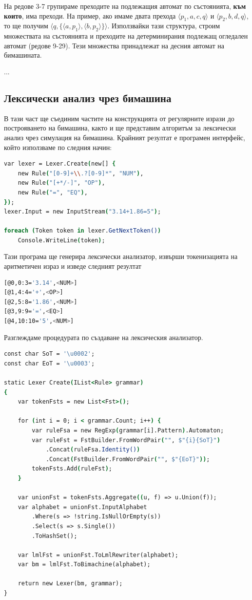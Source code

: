 \documentclass[12pt, oneside]{article}
\theoremstyle{definition}
\begin{document}
На редове 3-7 групираме преходите на подлежащия автомат по състоянията, \textbf{към които}, има преходи. На пример, ако имаме двата прехода \( \langle p_1, a, c, q \rangle \) и \( \langle p_2, b, d, q \rangle \), то ще получим \( \langle q, \{ \langle a, p_1 \rangle, \langle b, p_2 \rangle \} \rangle \). Използвайки тази структура, строим множествата на състоянията и преходите на детерминирания подлежащ огледален автомат (редове 9-29). Тези множества принадлежат на десния автомат на бимашината.

...

\subsection{Лексически анализ чрез бимашина}

В тази част ще съединим частите на конструкцията от регулярните изрази до построяването на бимашина, както и ще представим алгоритъм за лексически анализ чрез симулация на бимашина. Крайният резултат е програмен интерфейс, който използваме по следния начин:

\begin{lstlisting}[language=csh,firstnumber=1]
var lexer = Lexer.Create(new[] {
    new Rule("[0-9]+\\.?[0-9]*", "NUM"),
    new Rule("[+*/-]", "OP"),
    new Rule("=", "EQ"),
});
lexer.Input = new InputStream("3.14+1.86=5");

foreach (Token token in lexer.GetNextToken())
    Console.WriteLine(token);
\end{lstlisting}

Тази програма ще генерира лексически анализатор, извърши токенизацията на аритметичен израз и изведе следният резултат

\begin{lstlisting}[language=bash]
[@0,0:3='3.14',<NUM>]
[@1,4:4='+',<OP>]
[@2,5:8='1.86',<NUM>]
[@3,9:9='=',<EQ>]
[@4,10:10='5',<NUM>]
\end{lstlisting}

Разглеждаме процедурата по създаване на лексическия анализатор.

\begin{lstlisting}[language=csh]
const char SoT = '\u0002';
const char EoT = '\u0003';

static Lexer Create(IList<Rule> grammar)
{
    var tokenFsts = new List<Fst>();

    for (int i = 0; i < grammar.Count; i++) {
        var ruleFsa = new RegExp(grammar[i].Pattern).Automaton;
        var ruleFst = FstBuilder.FromWordPair("", $"{i}{SoT}")
            .Concat(ruleFsa.Identity())
            .Concat(FstBuilder.FromWordPair("", $"{EoT}"));
        tokenFsts.Add(ruleFst);
    }

    var unionFst = tokenFsts.Aggregate((u, f) => u.Union(f));
    var alphabet = unionFst.InputAlphabet
        .Where(s => !string.IsNullOrEmpty(s))
        .Select(s => s.Single())
        .ToHashSet();

    var lmlFst = unionFst.ToLmlRewriter(alphabet);
    var bm = lmlFst.ToBimachine(alphabet);

    return new Lexer(bm, grammar);
}
\end{lstlisting}
\end{document}
